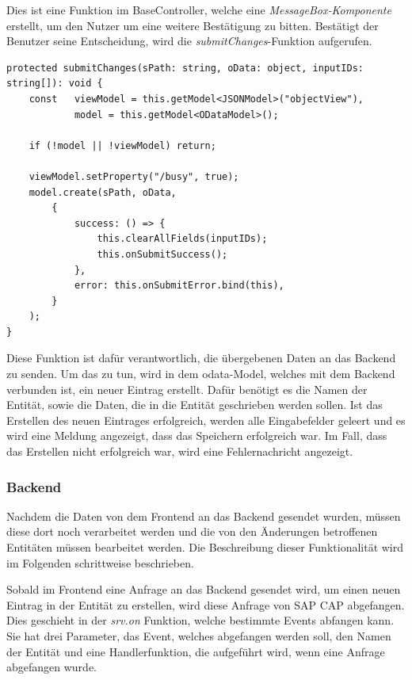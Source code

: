 Dies ist eine Funktion im BaseController, welche eine \textit{MessageBox-Komponente} erstellt, um den Nutzer um eine weitere Bestätigung zu bitten.
Bestätigt der Benutzer seine Entscheidung, wird die \textit{submitChanges}-Funktion aufgerufen.

\begin{lstlisting}[caption={submitChanges Funktion}]
protected submitChanges(sPath: string, oData: object, inputIDs: string[]): void {
    const   viewModel = this.getModel<JSONModel>("objectView"),
            model = this.getModel<ODataModel>();

    if (!model || !viewModel) return;

    viewModel.setProperty("/busy", true);
    model.create(sPath, oData,
        {
            success: () => {
                this.clearAllFields(inputIDs);
                this.onSubmitSuccess();
            },
            error: this.onSubmitError.bind(this),
        }
    );
} 
\end{lstlisting}

Diese Funktion ist dafür verantwortlich, die übergebenen Daten an das Backend zu senden.
Um das zu tun, wird in dem \gls{odata}-Model, welches mit dem Backend verbunden ist, ein neuer Eintrag erstellt.
Dafür benötigt es die Namen der Entität, sowie die Daten, die in die Entität geschrieben werden sollen.
Ist das Erstellen des neuen Eintrages erfolgreich, werden alle Eingabefelder geleert und es wird eine Meldung angezeigt, dass das Speichern erfolgreich war.
Im Fall, dass das Erstellen nicht erfolgreich war, wird eine Fehlernachricht angezeigt.

\subsubsection[Backend]{Backend}

Nachdem die Daten von dem Frontend an das Backend gesendet wurden, müssen diese dort noch verarbeitet werden und die von den Änderungen betroffenen Entitäten müssen bearbeitet werden.
Die Beschreibung dieser Funktionalität wird im Folgenden schrittweise beschrieben.

Sobald im Frontend eine Anfrage an das Backend gesendet wird, um einen neuen Eintrag in der Entität zu erstellen, wird diese Anfrage von SAP CAP abgefangen.
Dies geschieht in der \textit{srv.on} Funktion, welche bestimmte Events abfangen kann.
Sie hat drei Parameter, das Event, welches abgefangen werden soll, den Namen der Entität und eine Handlerfunktion, die aufgeführt wird, wenn eine Anfrage abgefangen wurde.

